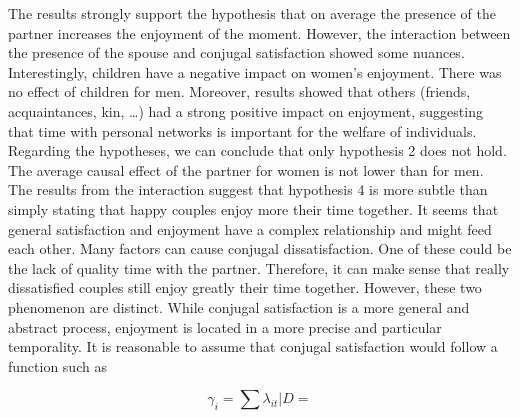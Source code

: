 \documentclass[doc, twocolumn]{apa}[12pt]
\begin{document}
The results strongly support the hypothesis that on average the presence of the partner increases the enjoyment of the moment. However, the interaction between the presence of the spouse and conjugal satisfaction showed some nuances. Interestingly, children have a negative impact on women's enjoyment. There was no effect of children for men. Moreover, results showed that others (friends, acquaintances, kin, \dots) had a strong positive impact on enjoyment, suggesting that time with personal networks is important for the welfare of individuals. Regarding the hypotheses, we can conclude that only hypothesis 2 does not hold. The average causal effect of the partner for women is not lower than for men. The results from the interaction suggest that hypothesis 4 is more subtle than simply stating that happy couples enjoy more their time together. It seems that general satisfaction and enjoyment have a complex relationship and might feed each other. Many factors can cause conjugal dissatisfaction. One of these could be the lack of quality time with the partner. Therefore, it can make sense that really dissatisfied couples still enjoy greatly their time together. However, these two phenomenon are distinct. While conjugal satisfaction is a more general and abstract process, enjoyment is located in a more precise and particular temporality. It is reasonable to assume that conjugal satisfaction would follow a function such as 


\begin{equation}	\gamma_{i} = \sum \lambda_{it} | D = \end{equation}




\clearpage
\onecolumn
\end{document}
